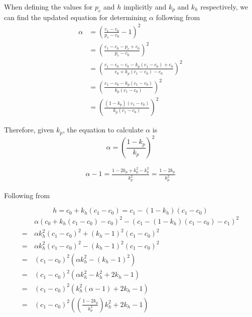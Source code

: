 When defining the values for $p_e$ and $h$ implicitly and $k_p$ and $k_h$ respectively, we can find the updated equation for determining $\alpha$ following from 
\begin{equation*}\begin{split}
		\alpha & = \left( \frac{c_1-c_0}{p_e-c_0} -1 \right)^2 \\
		& = \left( \frac{c_1-c_0-p_e+c_0}{p_e-c_0} \right)^2 \\
		& = \left( \frac{c_1-c_0 -c_0-k_p(c_1-c_0)+c_0}{c_0 + k_p(c_1-c_0)-c_0} \right)^2\\
		& = \left( \frac{c_1-c_0-k_p(c_1-c_0)}{k_p(c_1-c_0)} \right)^2\\
		& = \left( \frac{(1-k_p)(c_1-c_0)}{k_p(c_1-c_0)} \right)^2
\end{split}\end{equation*}

Therefore, given $k_p$, the equation to calculate $\alpha$ is
\begin{equation}
	\alpha = \left( \frac{1-k_p}{k_p} \right)^2
	\label{eq:alphafromkp}
\end{equation}

\begin{equation}\begin{split}
	\alpha-1 = \frac{1-2k_p+k_p^2-k_p^2}{k_p^2} = \frac{1-2k_p}{k_p^2}
\end{split}\end{equation}

Following from 

\begin{equation*}
	h = c_0+k_h(c_1-c_0) = c_1-(1-k_h)(c_1-c_0)
\end{equation*}
\begin{equation*}\begin{split}
	&\alpha (c_0+k_h(c_1-c_0)-c_0)^2-(c_1-(1-k_h)(c_1-c_0)-c_1)^2\\
	=\,& \alpha k_h^2 (c_1-c_0)^2 + (k_h-1)^2(c_1-c_0)^2 \\
	=\,& \alpha k_h^2(c_1-c_0)^2-(k_h-1)^2(c_1-c_0)^2 \\
	=\,& (c_1-c_0)^2(\alpha k_h^2-(k_h-1)^2)\\
	=\,& (c_1-c_0)^2 \left( \alpha k_h^2 - k_h^2 + 2k_h - 1 \right)\\
	=\,& (c_1-c_0)^2 \left( k_h^2(\alpha-1) + 2k_h -1 \right) \\
	=\,& (c_1-c_0)^2\left( \left( \frac{1-2k_p}{k_p^2} \right)k_h^2 +2k_h -1 \right)
\end{split}\end{equation*}

